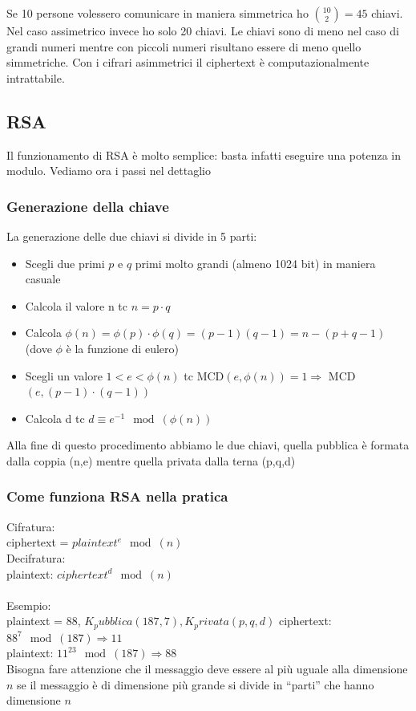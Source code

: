 \documentclass[10pt,a4paper]{article}
\begin{document}
Se 10 persone volessero comunicare in maniera simmetrica ho $\binom{10}{2} = 45$ chiavi. Nel caso assimetrico invece ho solo 20 chiavi. Le chiavi sono di meno nel caso di grandi numeri mentre con piccoli numeri risultano essere di meno quello simmetriche. Con i cifrari asimmetrici il ciphertext è computazionalmente intrattabile.
\subsection{RSA}
Il funzionamento di RSA è molto semplice: basta infatti eseguire una potenza in modulo. Vediamo ora i passi nel dettaglio
\subsubsection{Generazione della chiave}
La generazione delle due chiavi si divide in 5 parti:
\begin{itemize}
\item Scegli due primi $p$ e $q$ primi molto grandi (almeno 1024 bit) in maniera casuale
\item Calcola il valore n tc $n = p \cdot q$
\item Calcola $\phi(n) = \phi(p) \cdot \phi(q) = (p - 1)(q - 1) = n - (p + q -1)$ (dove $\phi$ è la funzione di eulero)
\item Scegli un valore $1<e<\phi(n)$ tc MCD$(e, \phi(n))=1 \Rightarrow$ MCD$(e,(p-1)\cdot(q-1))$
\item Calcola d tc $d \equiv e^{-1} \mod (\phi(n))$
\end{itemize}

Alla fine di questo procedimento abbiamo le due chiavi, quella pubblica è formata dalla coppia (n,e) mentre quella privata dalla terna (p,q,d)

\subsubsection{Come funziona RSA nella pratica}
Cifratura:\\
ciphertext = $plaintext^e \mod(n)$\\
Decifratura:\\
plaintext: $ciphertext^d \mod(n)$\\ \\
Esempio:\\
plaintext = 88, $K_pubblica(187,7), K_privata(p,q,d)$
ciphertext: $88^7 \mod(187) \Rightarrow 11$\\
plaintext: $11^23 \mod(187) \Rightarrow 88$\\
Bisogna fare attenzione che il messaggio deve essere al più uguale alla dimensione $n$ se il messaggio è di dimensione più grande si divide in ``parti'' che hanno dimensione $n$
\end{document}
